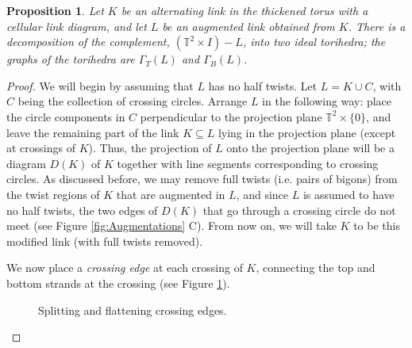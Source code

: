 \documentclass[11pt]{amsart}
\newcommand{\figref}[1]{Figure \ref{#1}}
\newcommand{\torus}{{\mathbb{T}^2}}
\theoremstyle{plain}
\newtheorem{prop}[theorem]{Proposition}
\theoremstyle{definition}
\begin{document}
\begin{prop}\label{p:tori_decomp}
Let $K$ be an alternating link in the thickened torus
with a cellular link diagram,
and let $L$ be an augmented link obtained from $K$.
There is a decomposition of the complement,
$(\torus \times I) - L$, into two ideal torihedra;
the graphs of the torihedra are $\Gamma_T(L)$ and $\Gamma_B(L)$.
\end{prop}


\begin{proof}



We will begin by assuming that $L$ has no half twists.
Let $L = K \cup C$, with $C$ being the collection of crossing circles.
Arrange $L$ in the following way:
place the circle components in $C$ perpendicular to
the projection plane $\torus \times \{0\}$,
and leave the remaining part of the link $K \subseteq L$
lying in the projection plane (except at crossings of $K$).
Thus, the projection of $L$ onto the projection plane
will be a diagram $D(K)$ of $K$
together with line segments corresponding to crossing circles.
As discussed before, we may remove full twists (i.e. pairs of bigons)
from the twist regions of $K$ that are augmented in $L$,
and since $L$ is assumed to have no half twists,
the two edges of $D(K)$ that go through a crossing circle
do not meet (see Figure \ref{fig:Augmentations} C).
From now on, we will take $K$ to be this modified link
(with full twists removed).


We now place a \emph{crossing edge} at each crossing of $K$,
connecting the top and bottom strands at the crossing
(see \figref{f:crossing-edges}).

\begin{figure} 

\label{f:crossing-edges}
\caption{Splitting and flattening crossing edges.}
\end{figure}



\end{proof}
\end{document}
